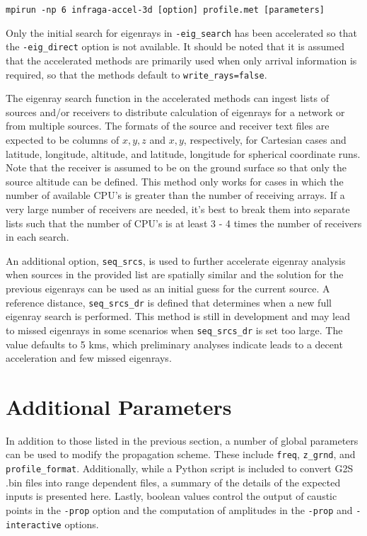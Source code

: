 \documentclass[10pt]{article}
\begin{document}
 \begin{center} 
 \verb#mpirun -np 6 infraga-accel-3d [option] profile.met [parameters]#
 \end{center}
Only the initial search for eigenrays in \verb=-eig_search= has been accelerated so that the \verb=-eig_direct= option is not available.  It should be noted that it is assumed that the accelerated methods are primarily used when only arrival information is required, so that the methods default to \verb#write_rays=false#.
  
The eigenray search function in the accelerated methods can ingest lists of sources and/or receivers to distribute calculation of eigenrays for a network or from multiple sources.  The formats of the source and receiver text files are expected to be columns of \(x, y, z\) and \(x, y\), respectively, for Cartesian cases and latitude, longitude, altitude, and latitude, longitude for spherical coordinate runs.  Note that the receiver is assumed to be on the ground surface so that only the source altitude can be defined.  This method only works for cases in which the number of available CPU's is greater than the number of receiving arrays.  If a very large number of receivers are needed, it's best to break them into separate lists such that the number of CPU's is at least 3 - 4 times the number of receivers in each search.  

An additional option, \verb=seq_srcs=, is used to further accelerate eigenray analysis when sources in the provided list are spatially similar and the solution for the previous eigenrays can be used as an initial guess for the current source.  A reference distance, \verb=seq_srcs_dr= is defined that determines when a new full eigenray search is performed.  This method is still in development and may lead to missed eigenrays in some scenarios when \verb=seq_srcs_dr= is set too large.  The value defaults to 5 kms, which preliminary analyses indicate leads to a decent acceleration and few missed eigenrays.
  
\newpage
\section{Additional Parameters}
\label{Sect:AdditionalParams}

\hspace{0.25in} In addition to those listed in the previous section, a number of global parameters can be used to modify the propagation scheme.  These include \verb#freq#, \verb#z_grnd#, and \verb#profile_format#. Additionally, while a Python script is included to convert G2S .bin files into range dependent files, a summary of the details of the expected inputs is presented here.  Lastly, boolean values control the output of caustic points in the \verb=-prop= option and the computation of amplitudes in the \verb=-prop= and \verb=-interactive= options.
\end{document}
